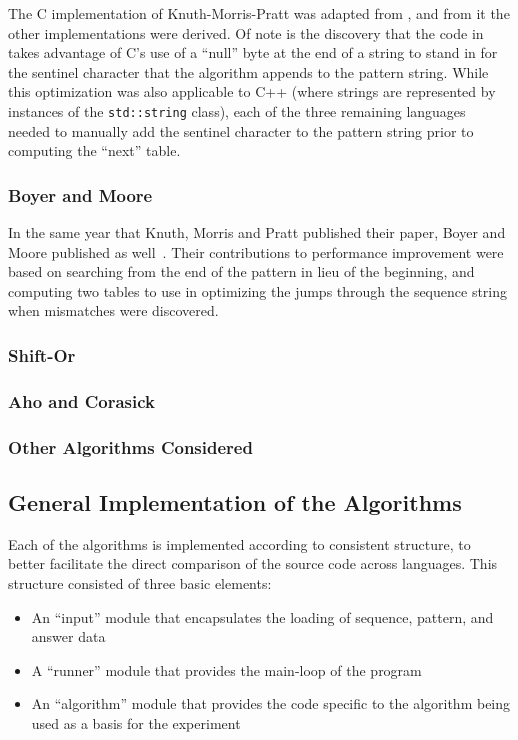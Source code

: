 The C implementation of Knuth-Morris-Pratt was adapted from \cite[Chapter 7]{handbook.2004}, and from it the other implementations were derived. Of note is the discovery that the code in \cite{handbook.2004} takes advantage of C's use of a ``null'' byte at the end of a string to stand in for the sentinel character that the algorithm appends to the pattern string. While this optimization was also applicable to C++ (where strings are represented by instances of the \texttt{std::string} class), each of the three remaining languages needed to manually add the sentinel character to the pattern string prior to computing the ``next'' table.

\subsubsection{Boyer and Moore}

In the same year that Knuth, Morris and Pratt published their paper, Boyer and Moore published as well~\cite{boyer.moore.1977}. Their contributions to performance improvement were based on searching from the end of the pattern in lieu of the beginning, and computing two tables to use in optimizing the jumps through the sequence string when mismatches were discovered.

\subsubsection{Shift-Or}

\subsubsection{Aho and Corasick}

\subsubsection{Other Algorithms Considered}

\subsection{General Implementation of the Algorithms}

Each of the algorithms is implemented according to consistent structure, to better facilitate the direct comparison of the source code across languages. This structure consisted of three basic elements:

\begin{itemize}
\item An ``input'' module that encapsulates the loading of sequence, pattern, and answer data
\item A ``runner'' module that provides the main-loop of the program
\item An ``algorithm'' module that provides the code specific to the algorithm being used as a basis for the experiment
\end{itemize}


